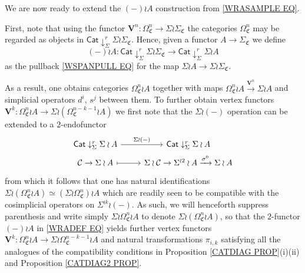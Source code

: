 \documentclass[a4paper,10pt
,draft
]{article}%
\numberwithin{equation}{section}
\numberwithin{figure}{section}
\theoremstyle{definition} %
\newcommand{\1}{\ensuremath{\mathbbm 1}}%
\begin{document}




\vskip 10pt


We are now ready to extend the $(-) \wr A$
construction from \eqref{WRASAMPLE EQ}.

First, note that using the functor
$\boldsymbol{V}^n \colon \Omega^n_{\mathfrak{C}} \to \Sigma \wr \Sigma_{\mathfrak{C}}$
the categories 
$\Omega^n_{\mathfrak{C}}$ may be regarded as objects in
$\mathsf{Cat} \downarrow^r_{\Sigma} \Sigma \wr \Sigma_{\mathfrak{C}}$.
Hence, given a functor $A \to \Sigma_{\mathfrak{C}}$
we define 
\begin{equation}\label{WRADEF EQ}
(-) \wr A \colon 
\mathsf{Cat} \downarrow^r_{\Sigma} \Sigma \wr \Sigma_{\mathfrak{C}}
\to
\mathsf{Cat} \downarrow^r_{\Sigma} \Sigma \wr A
\end{equation}
as the pullback \eqref{WSPANPULL EQ} for the map
$\Sigma \wr A \to \Sigma \wr \Sigma_{\mathfrak{C}}$.

As a result, one obtains categories $\Omega_{\mathfrak{C}}^n \wr A$
together with maps 
$\Omega_{\mathfrak{C}}^n \wr A 
\xrightarrow{\boldsymbol{V}^n} \Sigma \wr A$
and simplicial operators $d^i$, $s^j$ between them.
To further obtain vertex functors
$\boldsymbol{V}^k \colon \Omega^n_{\mathfrak{C}} \wr A
\to 
\Sigma \wr \left(\Omega^{n-k-1}_{\mathfrak{C}} \wr A \right)$
we first note that the $\Sigma \wr (-)$ operation can be extended to a $2$-endofunctor
\[
\begin{tikzcd}[row sep = 0pt]
	\mathsf{Cat} \downarrow^r_{\Sigma} \Sigma \wr A \ar{r}{\Sigma \wr (-)} &
	\mathsf{Cat} \downarrow^r_{\Sigma} \Sigma \wr A
\\
	\mathcal{C} \to \Sigma \wr A \ar[mapsto]{r} &
	\Sigma \wr \mathcal{C} \to \Sigma^{\wr 2} \wr A \xrightarrow{\sigma^{0}} \Sigma \wr A 
\end{tikzcd}
\]
from which it follows that one has natural identifications
$\Sigma \wr \left(\Omega^{n}_{\mathfrak{C}} \wr A \right)
\simeq 
\left(\Sigma \wr \Omega^{n}_{\mathfrak{C}}\right) \wr A $
which are readily seen to be compatible with the cosimplicial operators on $\Sigma^{\wr k} \wr (-)$.
As such, we will henceforth suppress parenthesis and write 
simply 
$\Sigma \wr \Omega^{n}_{\mathfrak{C}} \wr A$
to denote 
$\Sigma \wr \left(\Omega^{n}_{\mathfrak{C}} \wr A \right)$,
so that the $2$-functor $(-)\wr A$ in \eqref{WRADEF EQ}
yields further vertex functors 
$\boldsymbol{V}^k \colon \Omega^n_{\mathfrak{C}} \wr A
\to 
\Sigma \wr \Omega^{n-k-1}_{\mathfrak{C}} \wr A$
and natural transformations $\pi_{i,k}$
satisfying all the analogues of the compatibility conditions
in Proposition \ref{CATDIAG PROP}(i)(ii) and Proposition \ref{CATDIAG2 PROP}.
\end{document}
